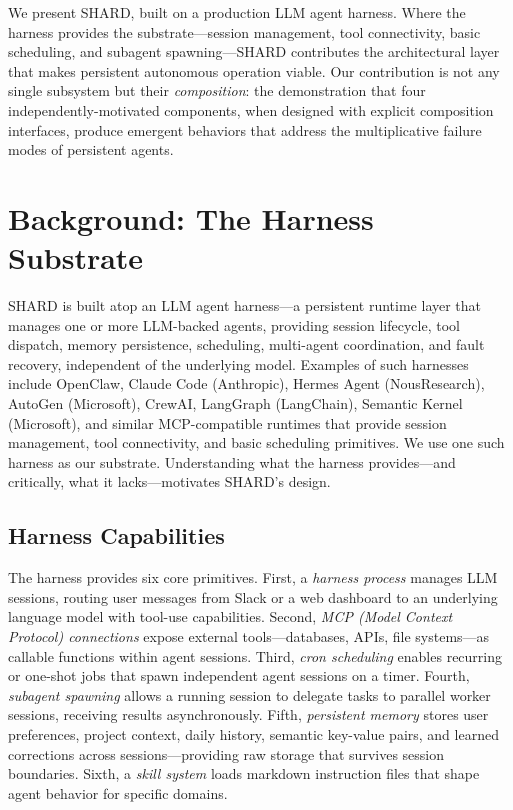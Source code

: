 \documentclass[11pt]{article}
\begin{document}
We present SHARD, built on a production LLM agent harness. Where the harness provides the substrate---session management, tool connectivity, basic scheduling, and subagent spawning---SHARD contributes the architectural layer that makes persistent autonomous operation viable. Our contribution is not any single subsystem but their \emph{composition}: the demonstration that four independently-motivated components, when designed with explicit composition interfaces, produce emergent behaviors that address the multiplicative failure modes of persistent agents.

\section{Background: The Harness Substrate}

SHARD is built atop an LLM agent harness---a persistent runtime layer that manages one or more LLM-backed agents, providing session lifecycle, tool dispatch, memory persistence, scheduling, multi-agent coordination, and fault recovery, independent of the underlying model. Examples of such harnesses include OpenClaw, Claude Code (Anthropic), Hermes Agent (NousResearch), AutoGen (Microsoft), CrewAI, LangGraph (LangChain), Semantic Kernel (Microsoft), and similar MCP-compatible runtimes that provide session management, tool connectivity, and basic scheduling primitives. We use one such harness as our substrate. Understanding what the harness provides---and critically, what it lacks---motivates SHARD's design.

\subsection{Harness Capabilities}

The harness provides six core primitives. First, a \emph{harness process} manages LLM sessions, routing user messages from Slack or a web dashboard to an underlying language model with tool-use capabilities. Second, \emph{MCP (Model Context Protocol) connections} expose external tools---databases, APIs, file systems---as callable functions within agent sessions. Third, \emph{cron scheduling} enables recurring or one-shot jobs that spawn independent agent sessions on a timer. Fourth, \emph{subagent spawning} allows a running session to delegate tasks to parallel worker sessions, receiving results asynchronously. Fifth, \emph{persistent memory} stores user preferences, project context, daily history, semantic key-value pairs, and learned corrections across sessions---providing raw storage that survives session boundaries. Sixth, a \emph{skill system} loads markdown instruction files that shape agent behavior for specific domains.
\end{document}

